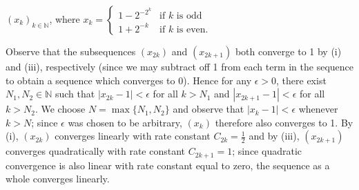 $(x_k)_{k \in \mathbb{N}}$, where $x_k = \begin{cases}
  1 - 2^{-2^k} & \text{if } k \text{ is odd} \\
  1 + 2^{-k} & \text{if } k \text{ is even.}
\end{cases}$

\begin{solution}
  Observe that the subsequences $(x_{2k})$ and $(x_{2k+1})$ both converge to 1 by (i) and (iii), respectively (since we
  may subtract off 1 from each term in the sequence to obtain a sequence which converges to 0). Hence for any 
  $\epsilon > 0$, there exist $N_1, N_2 \in \mathbb{N}$ such that $\left|x_{2k} - 1\right| < \epsilon$ for all $k > N_1$
  and $\left|x_{2k+1} - 1\right| < \epsilon$ for all $k > N_2$. We choose $N = \max\{N_1, N_2\}$ and observe that 
  $\left|x_k - 1 \right| < \epsilon$ whenever $k > N$; since $\epsilon$ was chosen to be arbitrary, $(x_k)$ therefore 
  also converges to 1. By (i), $(x_{2k})$ converges linearly with rate constant $C_{2k} = \frac{1}{2}$ and by (iii), 
  $(x_{2k+1})$ converges quadratically with rate constant $C_{2k+1} = 1$; since quadratic convergence is also linear 
  with rate constant equal to zero, the sequence as a whole converges linearly.
  \ \\
\end{solution}